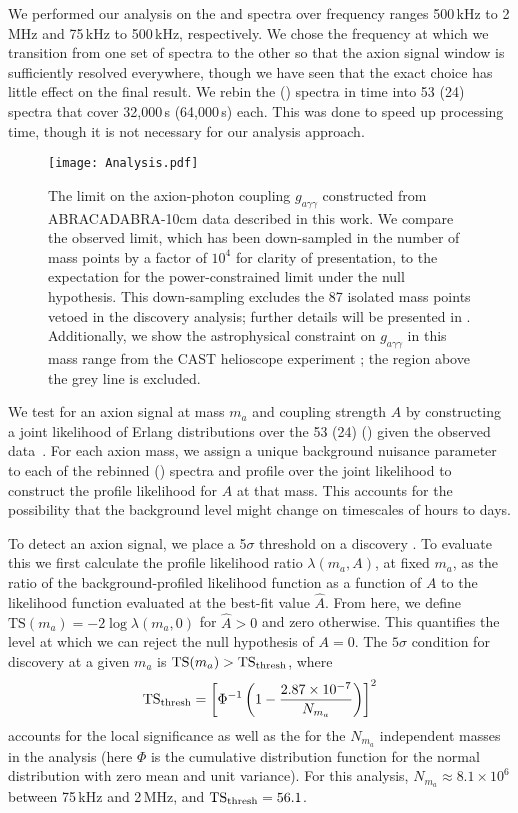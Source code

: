 \documentclass[aps,prl,amsmath,amssymb,reprint,superscriptaddress, nofootinbib,
]{revtex4-1}
\begin{document}
We performed our analysis on the \Pten and \Pone spectra over frequency ranges 500\,kHz to 2\,MHz and 75\,kHz to 500\,kHz, respectively. We chose the frequency at which we transition from one set of spectra to the other so that the axion signal window is sufficiently resolved everywhere, though we have seen that the exact choice has little effect on the final result.   
We rebin the \Pten (\Pone) spectra in time into 53 (24) spectra that cover 32,000\,s (64,000\,s) each. This was done to speed up processing time, though it is not necessary for our analysis approach.

\begin{figure*}[htb]
\centering
\texttt{[image: Analysis.pdf]}
\caption{ The limit on the axion-photon coupling $g_{a \gamma \gamma}$ constructed from ABRACADABRA-10cm data described in this work.  We compare the observed limit, which has been down-sampled in the number of mass points by a factor of $10^4$ for clarity of presentation, to the expectation for the power-constrained limit under the null hypothesis. This down-sampling excludes the 87 isolated mass points vetoed in the discovery analysis; further details will be presented in \cite{ABRA_10cm_Technical}.  Additionally, we show the astrophysical constraint on $g_{a\gamma\gamma}$ in this mass range from the CAST helioscope experiment \cite{CAST2017}; the region above the grey line is excluded. }
\label{fig:ExclusionCurve}
\end{figure*}


We test for an axion signal at mass $m_a$ and coupling strength $A$ by constructing a joint likelihood of Erlang distributions over the 53 (24) \Pten (\Pone) given the observed \PSD data~\cite{Foster2018,ABRA_10cm_Technical}. For each axion mass, we assign a unique background nuisance parameter to each of the rebinned \Pten (\Pone) spectra and profile over the joint likelihood to construct the profile likelihood for $A$ at that mass.  This accounts for the possibility that the background level might change on timescales of hours to days.

To detect an axion signal, we place a 5$\sigma$ threshold on a discovery \TS. To evaluate this we first calculate the profile likelihood ratio $\lambda(m_a,A)$, at fixed $m_a$, as the ratio of the background-profiled likelihood function as a function of $A$ to the likelihood function evaluated at the best-fit value $\hat A$. From here, we define $\text{TS}(m_a) = -2 \log \lambda(m_a,0)$ for $\hat A > 0$ and zero otherwise. This quantifies the level at which we can reject the null hypothesis of $A=0$. The $5\sigma$ condition for discovery at a given $m_a$ is ${\rm TS}(m_a) > {\rm TS}_{\rm thresh}$, where \cite{Foster2018}
\begin{equation}
{\rm TS}_{\rm thresh} = \left [ \Phi^{-1}\left(1 - \frac{2.87 \times 10^{-7}}{N_{m_a}}\right) \right]^2
\end{equation}
accounts for the local significance as well as the \LEE for the $N_{m_a}$ independent masses in the analysis (here $\Phi$ is the cumulative distribution function for the normal distribution with zero mean and unit variance). For this analysis, $N_{m_a} \approx8.1\times10^6$ between 75\,kHz and 2\,MHz, and ${\rm TS}_{\rm thresh} = 56.1$.
\end{document}
